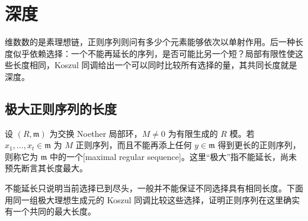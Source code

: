 
\section{深度}
\label{b3:sec:1601}

维数数的是素理想链，正则序列则问有多少个元素能够依次以单射作用。后一种长度似乎依赖选择：一个不能再延长的序列，是否可能比另一个短？局部有限性使这些长度相同，Koszul 同调给出一个可以同时比较所有选择的量，其共同长度就是深度。


%
%

\subsection{极大正则序列的长度}
\label{b3:subsec:1601:01}

\begin{definition}\label{b3:def:maximal-regular-sequence}
	设 \((R,\mathfrak m)\) 为交换 Noether 局部环，\(M\ne0\) 为有限生成的 \(R\) 模。若 \(x_1,\ldots,x_t\in\mathfrak m\) 为 \(M\) 正则序列，而且不能再添上任何 \(y\in\mathfrak m\) 得到更长的正则序列，则称它为 \(\mathfrak m\) 中的一个[maximal regular sequence]。这里“极大”指不能延长，尚未预先断言其长度最大。
\end{definition}

不能延长只说明当前选择已到尽头，一般并不能保证不同选择具有相同长度。下面用同一组极大理想生成元的 Koszul 同调比较这些选择，证明正则序列在这里确实有一个共同的最大长度。

